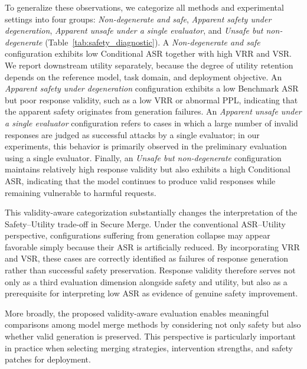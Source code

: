\documentclass{article}
\begin{document}
To generalize these observations, we categorize all methods and experimental settings into four groups: \textit{Non-degenerate and safe}, \textit{Apparent safety under degeneration}, \textit{Apparent unsafe under a single evaluator}, and \textit{Unsafe but non-degenerate} (Table~\ref{tab:safety_diagnostic}). 
A \textit{Non-degenerate and safe} configuration exhibits low Conditional
ASR together with high VRR and VSR. We report downstream utility separately,
because the degree of utility retention depends on the reference model,
task domain, and deployment objective. An \textit{Apparent safety under degeneration} configuration exhibits a low Benchmark ASR but poor response validity, such as a low VRR or abnormal PPL, indicating that the apparent safety originates from generation failures. An \textit{Apparent unsafe under a single evaluator} configuration refers to cases in which a large number of invalid responses are judged as successful attacks by a single evaluator; in our experiments, this behavior is primarily observed in the preliminary evaluation using a single evaluator. Finally, an \textit{Unsafe but non-degenerate} configuration maintains relatively high response validity but also exhibits a high Conditional ASR, indicating that the model continues to produce valid responses while remaining vulnerable to harmful requests.


This validity-aware categorization substantially changes the interpretation of the Safety--Utility trade-off in Secure Merge. Under the conventional ASR--Utility perspective, configurations suffering from generation collapse may appear favorable simply because their ASR is artificially reduced. By incorporating VRR and VSR, these cases are correctly identified as failures of response generation rather than successful safety preservation. Response validity therefore serves not only as a third evaluation dimension alongside safety and utility, but also as a prerequisite for interpreting low ASR as evidence of genuine safety improvement.

More broadly, the proposed validity-aware evaluation enables meaningful comparisons among model merge methods by considering not only safety but also whether valid generation is preserved. This perspective is particularly important in practice when selecting merging strategies, intervention strengths, and safety patches for deployment.
\end{document}
